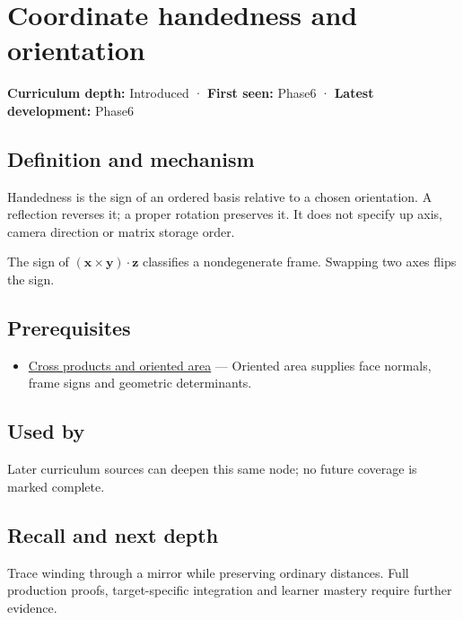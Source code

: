 \hypertarget{appendix-87d7626c8d37}{}\label{referencestart:appendix-87d7626c8d37}
\section{Coordinate handedness and orientation}\label{appendix-87d7626c8d37-coordinate-handedness-and-orientation}

\textbf{Curriculum depth:} Introduced · \textbf{First seen:} Phase6 · \textbf{Latest development:} Phase6

\subsection{Definition and mechanism}\label{appendix-87d7626c8d37-definition-and-mechanism}

Handedness is the sign of an ordered basis relative to a chosen orientation. A reflection reverses it; a proper rotation preserves it. It does not specify up axis, camera direction or matrix storage order.

The sign of \((\mathbf x\times\mathbf y)\cdot\mathbf z\) classifies a nondegenerate frame. Swapping two axes flips the sign.

\subsection{Prerequisites}\label{appendix-87d7626c8d37-prerequisites}

\begin{itemize}
\tightlist
\item
  \hyperref[appendix-2391db8052b1]{Cross products and oriented area} --- Oriented area supplies face normals, frame signs and geometric determinants.
\end{itemize}

\subsection{Used by}\label{appendix-87d7626c8d37-used-by}

Later curriculum sources can deepen this same node; no future coverage is marked complete.

\subsection{Recall and next depth}\label{appendix-87d7626c8d37-recall-and-next-depth}

Trace winding through a mirror while preserving ordinary distances. Full production proofs, target-specific integration and learner mastery require further evidence.

